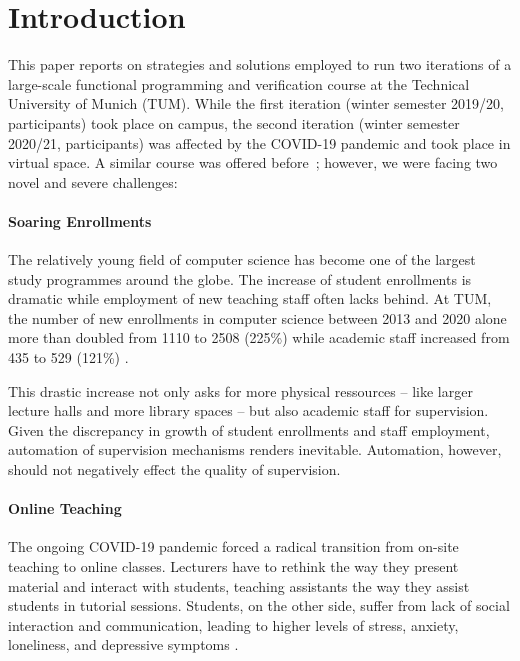 \section{Introduction}

This paper reports on strategies and solutions employed to
run two iterations of a large-scale functional programming and verification course at the Technical University of Munich (TUM).
While the first iteration (winter semester 2019/20,  participants)
took place on campus,
the second iteration (winter semester 2020/21,  participants) was affected by the COVID-19 pandemic and took place in virtual space.
A similar course was offered before~\citep{next_1100};
however, we were facing two novel and severe challenges:

\paragraph{Soaring Enrollments}
The relatively young field of computer science has
become one of the largest study programmes around the globe.
The increase of student enrollments is dramatic
\citep{comp_sci_growth1,comp_sci_growth2}
while employment of new teaching staff often lacks behind.
At TUM, the number of new enrollments in computer science between 2013 and 2020 alone
more than doubled from 1110 to 2508 (225\%)
while academic staff increased from 435 to 529 (121\%) \citep{tum_numbers}.

This drastic increase not only asks for more physical ressources -- like larger lecture halls and more library spaces --
but also academic staff for supervision.
Given the discrepancy in growth of student enrollments and staff employment,
automation of supervision mechanisms renders inevitable.
Automation, however, should not
negatively effect the quality of supervision.

\paragraph{Online Teaching}
The ongoing COVID-19 pandemic forced a radical
transition from on-site teaching to online classes.
Lecturers have to rethink the way they present material and interact with students,
teaching assistants the way they assist students in tutorial sessions.
Students, on the other side, suffer from lack of social interaction and communication, leading to higher
levels of stress, anxiety, loneliness, and depressive symptoms \citep{students_lockdown1}.

